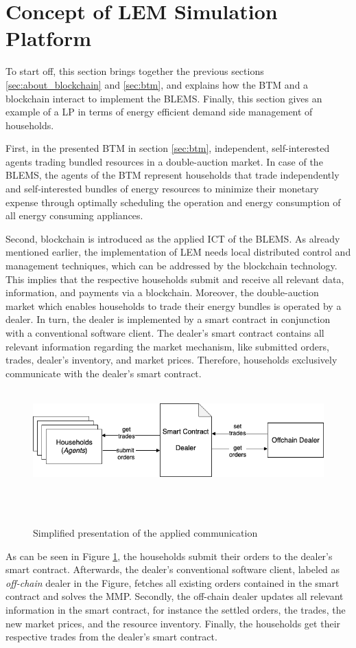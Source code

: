 \section{Concept of LEM Simulation Platform}
\label{sec:concept_of_lem}
To start off, this section brings together the previous sections \ref{sec:about_blockchain} and \ref{sec:btm},
and explains how the BTM and a blockchain interact to implement the BLEMS.
Finally, this section gives an example of a LP in terms of energy efficient demand side management of households. 

First, in the presented BTM in section \ref{sec:btm}, independent, self-interested agents trading bundled resources
in a double-auction market. 
In case of the BLEMS, the agents of the BTM represent households that 
trade independently and self-interested bundles of energy resources to minimize their monetary expense 
through optimally scheduling the operation and energy consumption 
of all energy consuming appliances.

Second, blockchain is introduced as the applied ICT of the BLEMS. 
As already mentioned earlier, the implementation of LEM needs local distributed control and 
management techniques, which can be addressed by the blockchain technology.
This implies that the respective households submit and receive all relevant data, information, and payments via a blockchain. 
Moreover, the double-auction market which enables households to trade their energy bundles is operated by a dealer.
In turn, the dealer is implemented by a smart contract in conjunction with a conventional software client. 
The dealer's smart contract contains all relevant information regarding the market mechanism, like submitted orders, trades, 
dealer's inventory, and market prices. 
Therefore, households exclusively communicate with the dealer's smart contract. 

\begin{figure}[htbp]
    \centering
    \includegraphics[width=.7\linewidth]{./figures/concept_lem.png}
    \caption{Simplified presentation of the applied communication}
    \label{figure:concept_lem}
\end{figure}

As can be seen in Figure \ref{figure:concept_lem}, the households submit their orders to the dealer's smart contract. 
Afterwards, the dealer's conventional software client, labeled as \textit{off-chain} dealer in the Figure, fetches all existing orders contained in the smart contract
and solves the MMP.
Secondly, the off-chain dealer updates all relevant information in the smart contract, for instance 
the settled orders, the trades, the new market prices, and the resource inventory.
Finally, the households get their respective trades from the dealer's smart contract. 

